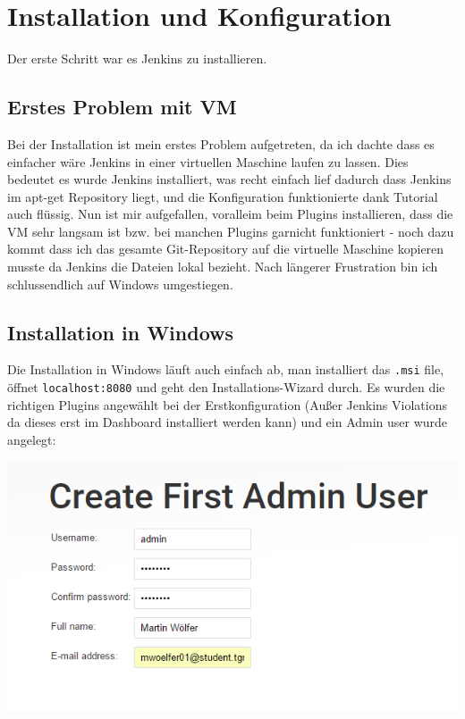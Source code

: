 
\section{Installation und Konfiguration}
Der erste Schritt war es Jenkins zu installieren.

\subsection{Erstes Problem mit VM}

Bei der Installation ist mein erstes Problem aufgetreten, da ich dachte dass es einfacher wäre Jenkins in einer virtuellen Maschine laufen zu lassen. Dies bedeutet es wurde Jenkins installiert, was recht einfach lief dadurch dass Jenkins im apt-get Repository liegt, und die Konfiguration funktionierte dank Tutorial auch flüssig. Nun ist mir aufgefallen, voralleim beim Plugins installieren, dass die VM sehr langsam ist bzw. bei manchen Plugins garnicht funktioniert - noch dazu kommt dass ich das gesamte Git-Repository auf die virtuelle Maschine kopieren musste da Jenkins die Dateien lokal bezieht. Nach längerer Frustration bin ich schlussendlich auf Windows umgestiegen.

\subsection{Installation in Windows}
Die Installation in Windows läuft auch einfach ab, man installiert das \verb|.msi| file, öffnet \verb|localhost:8080| und geht den Installations-Wizard durch. Es wurden die richtigen Plugins angewählt bei der Erstkonfiguration (Außer Jenkins Violations da dieses erst im Dashboard installiert werden kann) und ein Admin user wurde angelegt:

\begin{minipage}{\linewidth}
	\centering
	\includegraphics[width=0.8\linewidth]{images/create_admin}
\end{minipage}


